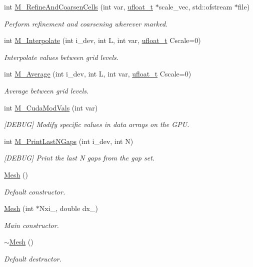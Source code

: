 \begin{DoxyCompactItemize}
int \hyperlink{classMesh_a7f1c861db5b8168cff9dabf728c0ce1a}{M\+\_\+\+Refine\+And\+Coarsen\+Cells} (int var, \hyperlink{cppspec_8h_af529d360dfac9b9578aa719418a53a21}{ufloat\+\_\+t} $\ast$scale\+\_\+vec, std\+::ofstream $\ast$file)
\begin{DoxyCompactList}\small\item\em Perform refinement and coarsening wherever marked. \end{DoxyCompactList}\item 
int \hyperlink{classMesh_aeb91bf44cbf5e9edfa52e8ac06d003ce}{M\+\_\+\+Interpolate} (int i\+\_\+dev, int L, int var, \hyperlink{cppspec_8h_af529d360dfac9b9578aa719418a53a21}{ufloat\+\_\+t} Cscale=0)
\begin{DoxyCompactList}\small\item\em Interpolate values between grid levels. \end{DoxyCompactList}\item 
int \hyperlink{classMesh_a4c0709e00c84ca8957713f681cad1897}{M\+\_\+\+Average} (int i\+\_\+dev, int L, int var, \hyperlink{cppspec_8h_af529d360dfac9b9578aa719418a53a21}{ufloat\+\_\+t} Cscale=0)
\begin{DoxyCompactList}\small\item\em Average between grid levels. \end{DoxyCompactList}\item 
int \hyperlink{classMesh_ad70a286b2d0da0c8b1f7de939bb5d65e}{M\+\_\+\+Cuda\+Mod\+Vals} (int var)
\begin{DoxyCompactList}\small\item\em \mbox{[}D\+E\+B\+UG\mbox{]} Modify specific values in data arrays on the G\+PU. \end{DoxyCompactList}\item 
int \hyperlink{classMesh_aa8af131d960c3a98cba329620a678ab4}{M\+\_\+\+Print\+Last\+N\+Gaps} (int i\+\_\+dev, int N)
\begin{DoxyCompactList}\small\item\em \mbox{[}D\+E\+B\+UG\mbox{]} Print the last N gaps from the gap set. \end{DoxyCompactList}\item 
\hyperlink{classMesh_a2af137f1571af89172b9c102302c416b}{Mesh} ()
\begin{DoxyCompactList}\small\item\em Default constructor. \end{DoxyCompactList}\item 
\hyperlink{classMesh_ae13aff57d73893651b5386ecdba97cd3}{Mesh} (int $\ast$Nxi\+\_\+, double dx\+\_\+)
\begin{DoxyCompactList}\small\item\em Main constructor. \end{DoxyCompactList}\item 
\hyperlink{classMesh_a5efe4da1a4c0971cfb037bd70304c303}{$\sim$\+Mesh} ()
\begin{DoxyCompactList}\small\item\em Default destructor. \end{DoxyCompactList}\end{DoxyCompactItemize}
